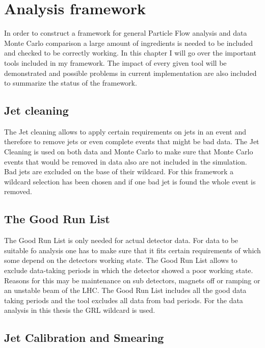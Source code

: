 \chapter{Analysis framework}

In order to construct a framework for general Particle Flow analysis and data Monte Carlo comparison a large amount of ingredients is needed to be included and checked to be correctly working. In this chapter I will go over the important tools included in my framework. The impact of every given tool will be demonstrated and possible problems in current implementation are also included to summarize the status of the framework.


\section{Jet cleaning}

The Jet cleaning allows to apply certain requirements on jets in an event and therefore to remove jets or even complete events that might be bad data. The Jet Cleaning is used on both data and Monte Carlo to make sure that Monte Carlo events that would be removed in data also are not included in the simulation.
Bad jets are excluded on the base of their wildcard.
For this framework a wildcard selection has been chosen and if one bad jet is found the whole event is removed.

\section{The Good Run List}

The Good Run List is only needed for actual detector data. For data to be suitable fo analysis one has to make sure that it fits certain requirements of which some depend on the detectors working state. The Good Run List allows to exclude data-taking periods in which the detector showed a poor working state. Reasons for this may be maintenance on sub detectors, magnets off or ramping or an unstable beam of the LHC.
The Good Run List includes all the good data taking periods and the tool excludes all data from bad periods.
For the data analysis in this thesis the GRL wildcard is used.

\section{Jet Calibration and Smearing}

